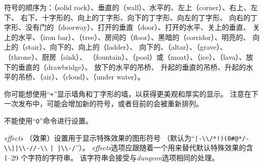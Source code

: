 \documentclass[a4paper, 10pt]{article}
\newcommand{\ib}[1]{\it #1 \hfill}
\begin{document}
符号的顺序为：\zhTransSolidRock（solid rock）、垂直的\zhTransWall（wall）、水平的\zhTransWall、左上\zhTransCorner（corner）、右上\zhTransCorner、左下\zhTransCorner、
右下\zhTransCorner、十字形的\zhTransWall、向上的丁字形\zhTransWall、向下的丁字形\zhTransWall、向左的丁字形\zhTransWall、
向右的丁字形\zhTransWall、没有门的\zhTransDoorway（doorway）、打开的垂直\zhTransDoor{}（door）、打开的水平\zhTransDoor、关上的垂直\zhTransDoor、
关上的水平\zhTransDoor、\zhTransIronBars（iron bar）、\zhTransTree（tree）、房间的\zhTransFloor（floor）、黑暗的\zhTransCorridor（corridor）、明亮的\zhTransCorridor、
向上的\zhTransStairs（stair）、向下的\zhTransStairs、向上的\zhTransLadders（ladder）、
向下的\zhTransLadders、\zhTransAltar（altar）、\zhTransGrave（grave）、\zhTransThrone（throne）、厨房\zhTransSink（sink）、
\zhTransFountain（fountain）、\zhTransPool（pool）或\zhTransMoat（moat）、\zhTransIce（ice）、\zhTransLava（lava）、放下的垂直的\zhTransDrawbridge（drawbridge）、
放下的水平的吊桥、
升起的垂直的吊桥、升起的水平的吊桥、\zhTransAir（air）、\zhTransCloud（cloud）、\zhTransUnderWater（under water）。

你可能想使用“{\tt +}”显示墙角和丁字形的墙，以获得更美观和厚实的显示。
注意在下一次发布中，可能会增加新的符号，或者目前的会被重新排列。

不能使用“{\tt O}”命令进行设置。
\item[\ib{effects}]
（效果）设置用于显示特殊效果的图形符号
（默认为“\verb&|-\\/*!)(0#@*/-\\||\\-//-\\& \verb&| |\\-/&”）。
{\it effects\/}选项应跟随着一个用来替代默认特殊效果的含 1--29 个字符的字符串。
该字符串会接受与{\it dungeon\/}选项相同的处理。
\end{document}
